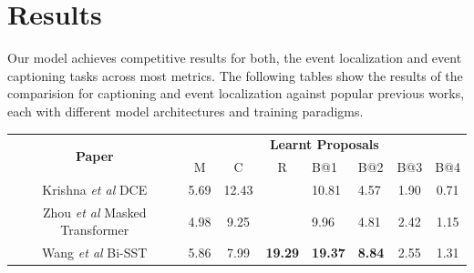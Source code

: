\section{Results}

Our model achieves competitive results for both, the event localization and event captioning tasks across most metrics. The following tables show the results of the comparision for captioning and event localization against popular previous works, each with different model architectures and training paradigms.
\begin{table}[h] \label{table:capeval}
	\centering
	\begin{tabular}{|c|cclllcc|}
		\hline
		\multirow{2}{*}{\textbf{Paper}}        & \multicolumn{7}{c|}{\textbf{Learnt Proposals}}                                                                                                                                                                                                                        \\ \cline{2-8} 
		& \multicolumn{1}{c|}{M}             & \multicolumn{1}{c|}{C}              & \multicolumn{1}{c|}{R}               & \multicolumn{1}{l|}{B@1}             & \multicolumn{1}{l|}{B@2}           & \multicolumn{1}{c|}{B@3}           & B@4                                \\ \hline
		{Krishna \textit{et al} \cite{krishna2017densecaptioning} DCE}                                 & \multicolumn{1}{c|}{5.69}          & \multicolumn{1}{c|}{12.43}          & \multicolumn{1}{l|}{}                & \multicolumn{1}{l|}{10.81}           & \multicolumn{1}{l|}{4.57}          & \multicolumn{1}{c|}{1.90}          & 0.71                               \\ \hline
		{Zhou \textit{et al} \cite{zhou2018end} Masked Transformer}                & \multicolumn{1}{c|}{4.98}          & \multicolumn{1}{c|}{9.25}           & \multicolumn{1}{l|}{}                & \multicolumn{1}{l|}{9.96}            & \multicolumn{1}{l|}{4.81}          & \multicolumn{1}{c|}{2.42}          & 1.15                               \\ \hline
		{Wang \textit{et al} \cite{wang2018bidirectional} Bi-SST}                       & \multicolumn{1}{c|}{5.86}          & \multicolumn{1}{c|}{7.99}           & \multicolumn{1}{l|}{\textbf{19.29}}           & \multicolumn{1}{l|}{\textbf{19.37}}           & \multicolumn{1}{l|}{\textbf{8.84}}          & \multicolumn{1}{c|}{2.55}          & 1.31                               \\ \hline

\end{tabular}
\end{table}
